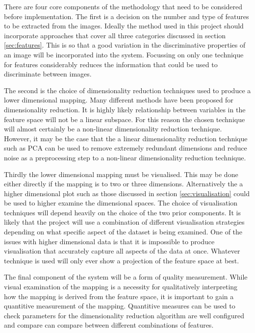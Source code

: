 There are four core components of the methodology that need to be considered before implementation. The first is a decision on the number and type of features to be extracted from the images. Ideally the method used in this project should incorporate approaches that cover all three categories discussed in section \ref{sec:features}. This is so that a good variation in the discriminative properties of an image will be incorporated into the system. Focussing on only one technique for features considerably reduces the information that could be used to discriminate between images.

The second is the choice of dimensionality reduction techniques used to produce a lower dimensional mapping. Many different methods have been proposed for dimensionality reduction. It is highly likely relationship between variables in the feature space will not be a linear subspace. For this reason the chosen technique will almost certainly be a non-linear dimensionality reduction technique. However, it may be the case that the a linear dimensionality reduction technique such as PCA can be used to remove extremely redundant dimensions and reduce noise as a preprocessing step to a non-linear dimensionality reduction technique.    

Thirdly the lower dimensional mapping must be visualised. This may be done either directly if the mapping is to two or three dimensions. Alternatively the a higher dimensional plot such as those discussed in section \ref{sec:visualisation} could be used to higher examine the dimensional spaces. The choice of visualisation techniques will depend heavily on the choice of the two prior components. It is likely that the project will use a combination of different visualisation strategies depending on what specific aspect of the dataset is being examined. One of the issues with higher dimensional data is that it is impossible to produce visualisation that accurately capture all aspects of the data at once. Whatever technique is used will only ever show a projection of the feature space at best.

The final component of the system will be a form of quality measurement. While visual examination of the mapping is a necessity for qualitatively interpreting how the mapping is derived from the feature space, it is important to gain a quantitive measurement of the mapping. Quantitive measures can be used to check parameters for the dimensionality reduction algorithm are well configured and compare can compare between different combinations of features. 

